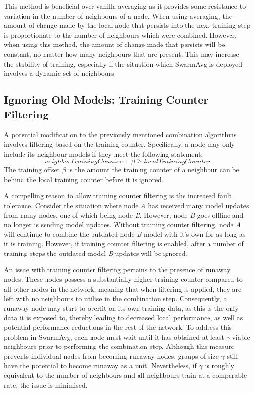This method is beneficial over vanilla averaging as it provides some resistance to variation in the number of neighbours of a node. When using averaging, the amount of change made by the local node that persists into the next training step is proportionate to the number of neighbours which were combined. However, when using this method, the amount of change made that persists will be constant, no matter how many neighbours that are present. This may increase the stability of training, especially if the situation which SwarmAvg is deployed involves a dynamic set of neighbours.

\subsection{Ignoring Old Models: Training Counter Filtering}
A potential modification to the previously mentioned combination algorithms involves filtering based on the training counter. Specifically, a node may only include its neighbour models if they meet the following statement:
\[neighborTrainingCounter + \beta \ge localTrainingCounter \]
The training offset $\beta$ is the amount the training counter of a neighbour can be behind the local training counter before it is ignored.

A compelling reason to allow training counter filtering is the increased fault tolerance. Consider the situation where node \emph{A} has received many model updates from many nodes, one of which being node \emph{B}. However, node \emph{B} goes offline and no longer is sending model updates. Without training counter filtering, node \emph{A} will continue to combine the outdated node \emph{B} model with it's own for as long as it is training. However, if training counter filtering is enabled, after a number of training steps the outdated model \emph{B} updates will be ignored.

An issue with training counter filtering pertains to the presence of runaway nodes. These nodes possess a substantially higher training counter compared to all other nodes in the network, meaning that when filtering is applied, they are left with no neighbours to utilise in the combination step. Consequently, a runaway node may start to overfit on its own training data, as this is the only data it is exposed to, thereby leading to decreased local performance, as well as potential performance reductions in the rest of the network. To address this problem in SwarmAvg, each node must wait until it has obtained at least $\gamma$ viable neighbours prior to performing the combination step. Although this measure prevents individual nodes from becoming runaway nodes, groups of size $\gamma$ still have the potential to become runaway as a unit. Nevertheless, if $\gamma$ is roughly equivalent to the number of neighbours and all neighbours train at a comparable rate, the issue is minimised.

